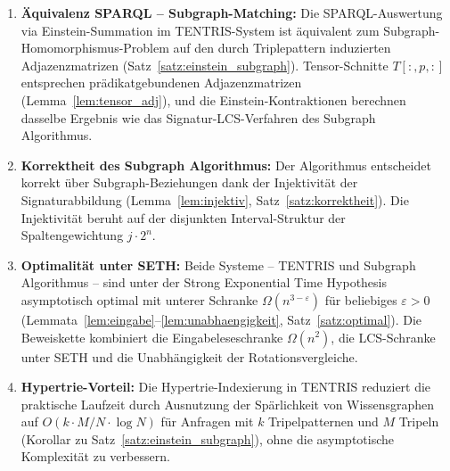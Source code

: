 ﻿\documentclass[a4paper,12pt]{article}
\theoremstyle{definition}
\begin{document}
\begin{enumerate}
  \item \textbf{Äquivalenz SPARQL -- Subgraph-Matching:} Die SPARQL-Auswertung via
        Einstein-Summation im TENTRIS-System ist äquivalent zum
        Subgraph-Homomorphismus-Problem auf den durch Triplepattern induzierten
        Adjazenzmatrizen (Satz~\ref{satz:einstein_subgraph}). Tensor-Schnitte
        $T[:,p,:]$ entsprechen prädikatgebundenen Adjazenzmatrizen
        (Lemma~\ref{lem:tensor_adj}), und die Einstein-Kontraktionen berechnen
        dasselbe Ergebnis wie das Signatur-LCS-Verfahren des Subgraph Algorithmus.

  \item \textbf{Korrektheit des Subgraph Algorithmus:} Der Algorithmus entscheidet
        korrekt über Subgraph-Beziehungen dank der Injektivität der Signaturabbildung
        (Lemma~\ref{lem:injektiv}, Satz~\ref{satz:korrektheit}). Die Injektivität beruht
        auf der disjunkten Interval-Struktur der Spaltengewichtung $j \cdot 2^n$.

  \item \textbf{Optimalität unter SETH:} Beide Systeme -- TENTRIS und Subgraph
        Algorithmus -- sind unter der Strong Exponential Time Hypothesis asymptotisch
        optimal mit unterer Schranke $\Omega(n^{3-\varepsilon})$ für beliebiges
        $\varepsilon > 0$ (Lemmata~\ref{lem:eingabe}--\ref{lem:unabhaengigkeit},
        Satz~\ref{satz:optimal}). Die Beweiskette kombiniert die
        Eingabeleseschranke $\Omega(n^2)$, die LCS-Schranke unter SETH und die
        Unabhängigkeit der Rotationsvergleiche.

  \item \textbf{Hypertrie-Vorteil:} Die Hypertrie-Indexierung in TENTRIS reduziert
        die praktische Laufzeit durch Ausnutzung der Spärlichkeit von Wissensgraphen
        auf $O(k \cdot M/N \cdot \log N)$ für Anfragen mit $k$ Tripelpatternen und
        $M$ Tripeln (Korollar zu Satz~\ref{satz:einstein_subgraph}), ohne die
        asymptotische Komplexität zu verbessern.


\end{enumerate}
\end{document}
